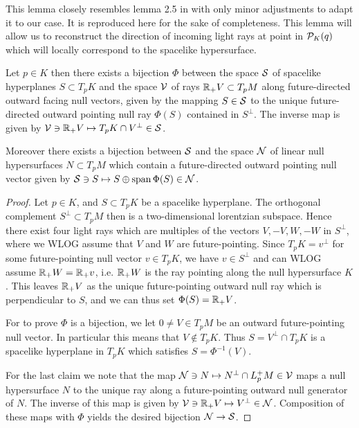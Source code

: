 This lemma closely resembles lemma 2.5 in \cite{hintzpaper} with only minor adjustments to adapt it to our case. It is reproduced here for the sake of completeness.
This lemma will allow us to reconstruct the direction of incoming light rays at point in ${\mathcal{P}}_K(q)$ which will locally correspond to the spacelike hypersurface.
\begin{lemma}\label{lem:dirreconstr}
Let $p\in K$ then there exists a bijection $\Phi$ between the space ${\mathcal{S}}$ of spacelike hyperplanes $S\subset T_pK$ and the space ${\mathcal{V}}$ of rays $\mathbb{R}_+V\subset T_pM$ along future-directed outward facing null vectors, given by the mapping $S\in {\mathcal{S}}$ to the unique future-directed outward pointing null ray $\Phi(S)$ contained in $S^\perp$. The inverse map is given by ${\mathcal{V}}\ni \mathbb{R}_+V \mapsto T_pK \cap V^\perp\in {\mathcal{S}}$.

Moreover there exists a bijection between ${\mathcal{S}}$ and the space ${\mathcal{N}}$ of linear null hypersurfaces $N\subset T_pM$ which contain a future-directed outward pointing null vector given by ${\mathcal{S}}\ni S\mapsto S\oplus \operatorname{span} \Phi(S)\in {\mathcal{N}}$.
\end{lemma}
\begin{proof}
    Let $p\in K$, and $S\subset T_pK$ be a spacelike hyperplane. The orthogonal complement $S^\perp\subset T_pM$ then is a two-dimensional lorentzian subspace. Hence there exist four light rays which are multiples of the vectors $V,-V,W,-W$ in $S^\perp$, where we WLOG assume that $V$ and $W$ are future-pointing. Since $T_pK=v^\perp$ for some future-pointing null vector $v\in T_pK$, we have $v\in S^\perp$ and can WLOG assume $\mathbb{R}_+W=\mathbb{R}_+v$, i.e. $\mathbb{R}_+W$ is the ray pointing along the null hypersurface $K$. This leaves $\mathbb{R}_+V$ as the unique future-pointing outward null ray which is perpendicular to $S$, and we can thus set $\Phi(S)=\mathbb{R}_+V$.

    For to prove $\Phi$ is a bijection, we let $0\neq V\in T_pM$ be an outward future-pointing null vector. In particular this means that $V\notin T_pK$. Thus $S=V^\perp\cap T_pK$ is a spacelike hyperplane in $T_pK$ which satisfies $S=\Phi^{-1}(V)$.

    For the last claim we note that the map ${\mathcal{N}}\ni N \mapsto N^\perp \cap L^+_pM \in {\mathcal{V}}$ maps a null hypersurface $N$ to the unique ray along a future-pointing outward null generator of $N$. The inverse of this map is given by ${\mathcal{V}}\ni \mathbb{R}_+V\mapsto V^\perp \in {\mathcal{N}}$. Composition of these maps with $\Phi$ yields the desired bijection ${\mathcal{N}}\to {\mathcal{S}}$.
\end{proof}

